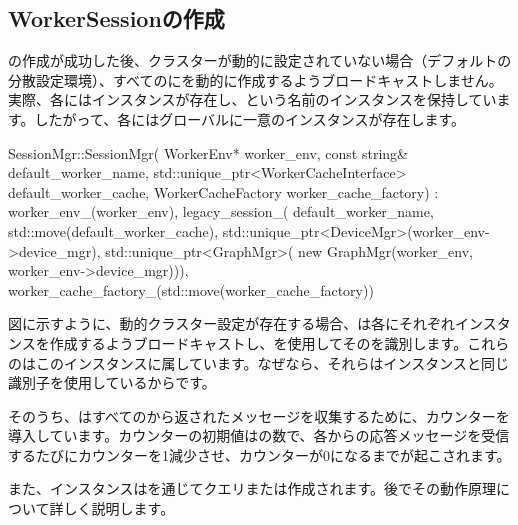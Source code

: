 \begin{content}
\subsection{WorkerSessionの作成}

の作成が成功した後、クラスターが動的に設定されていない場合（デフォルトの分散設定環境）、すべてのにを動的に作成するようブロードキャストしません。実際、各にはインスタンスが存在し、という名前のインスタンスを保持しています。したがって、各にはグローバルに一意のインスタンスが存在します。

\begin{leftbar}
\begin{c++}
SessionMgr::SessionMgr(
    WorkerEnv* worker_env, 
    const string& default_worker_name,
    std::unique_ptr<WorkerCacheInterface> default_worker_cache,
    WorkerCacheFactory worker_cache_factory)
    : worker_env_(worker_env),
      legacy_session_(
          default_worker_name, 
          std::move(default_worker_cache),
          std::unique_ptr<DeviceMgr>(worker_env->device_mgr),
          std::unique_ptr<GraphMgr>(
              new GraphMgr(worker_env, 
              worker_env->device_mgr))),
      worker_cache_factory_(std::move(worker_cache_factory)) {}
\end{c++}
\end{leftbar}

図に示すように、動的クラスター設定が存在する場合、は各にそれぞれインスタンスを作成するようブロードキャストし、を使用してそのを識別します。これらのはこのインスタンスに属しています。なぜなら、それらはインスタンスと同じ識別子を使用しているからです。

そのうち、はすべてのから返されたメッセージを収集するために、カウンターを導入しています。カウンターの初期値はの数で、各からの応答メッセージを受信するたびにカウンターを1減少させ、カウンターが0になるまでが起こされます。

また、インスタンスはを通じてクエリまたは作成されます。後でその動作原理について詳しく説明します。


\end{content}
